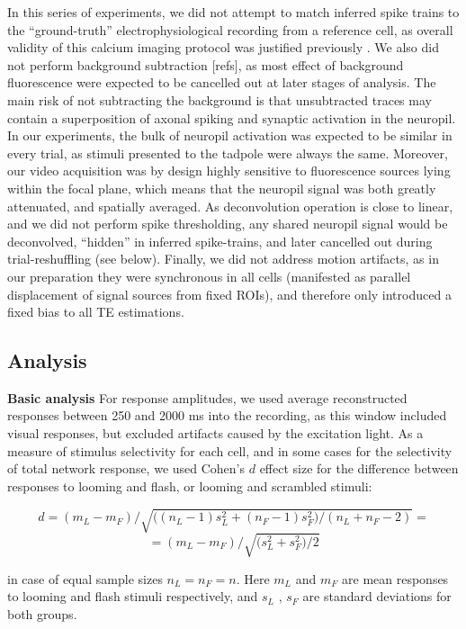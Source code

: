 \documentclass{article}
\begin{document}
In this series of experiments, we did not attempt to match inferred spike trains to the “ground-truth” electrophysiological recording from a reference cell, as overall validity of this calcium imaging protocol was justified previously \citep{xu2011,truszkowski2017}. We also did not perform background subtraction [refs], as most effect of background fluorescence were expected to be cancelled out at later stages of analysis. The main risk of not subtracting the background is that unsubtracted traces may contain a superposition of axonal spiking and synaptic activation in the neuropil. In our experiments, the bulk of neuropil activation was expected to be similar in every trial, as stimuli presented to the tadpole were always the same. Moreover, our video acquisition was by design highly sensitive to fluorescence sources lying within the focal plane, which means that the neuropil signal was both greatly attenuated, and spatially averaged. As deconvolution operation is close to linear, and we did not perform spike thresholding, any shared neuropil signal would be deconvolved, “hidden” in inferred spike-trains, and later cancelled out during trial-reshuffling (see below). Finally, we did not address motion artifacts, as in our preparation they were synchronous in all cells (manifested as parallel displacement of signal sources from fixed ROIs), and therefore only introduced a fixed bias to all TE estimations.

\subsection*{Analysis}

\textbf{Basic analysis} For response amplitudes, we used average reconstructed responses between 250 and 2000 ms into the recording, as this window included visual responses, but excluded artifacts caused by the excitation light. As a measure of stimulus selectivity for each cell, and in some cases for the selectivity of total network response, we used Cohen’s $d$ effect size for the difference between responses to looming and flash, or looming and scrambled stimuli:

\[ d = (m_L-m_F)/ \sqrt{ \big((n_L-1) s^2_L + (n_F-1) s^2_F)/(n_L + n_F - 2)} = \]
\[ =(m_L-m_F)/\sqrt{\big(s^2_L+s^2_F\big)/2} \]

in case of equal sample sizes $n_L=n_F=n$. Here $m_L$ and $m_F$ are mean responses to looming and flash stimuli respectively, and $s_L$ , $s_F$ are standard deviations for both groups.
\end{document}
